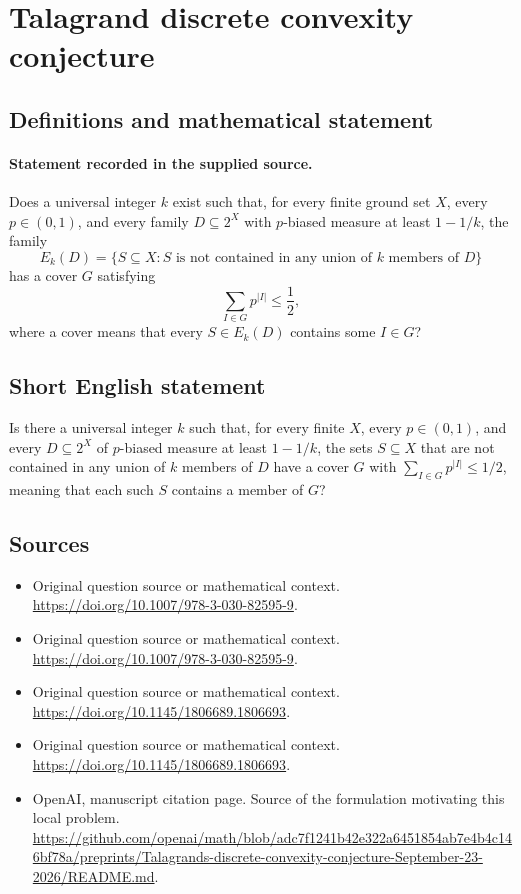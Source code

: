 \documentclass[11pt]{article}
\begin{document}
\section*{Talagrand discrete convexity conjecture}\label{30007105}
\subsection{Definitions and mathematical statement}
\paragraph{Statement recorded in the supplied source.}
Does a universal integer $k$ exist such that, for every finite ground set $X$, every $p\in(0,1)$, and every family $D\subseteq 2^X$ with $p$-biased measure at least $1-1/k$, the family
\[
E_k(D)=\{S\subseteq X:S\text{ is not contained in any union of }k\text{ members of }D\}
\]
has a cover $G$ satisfying
\[
\sum_{I\in G}p^{|I|}\leq\frac12,
\]
where a cover means that every $S\in E_k(D)$ contains some $I\in G$?
\subsection{Short English statement}
Is there a universal integer $k$ such that, for every finite $X$, every $p\in(0,1)$, and every $D\subseteq2^X$ of $p$-biased measure at least $1-1/k$, the sets $S\subseteq X$ that are not contained in any union of $k$ members of $D$ have a cover $G$ with $\sum_{I\in G}p^{|I|}\leq1/2$, meaning that each such $S$ contains a member of $G$?
\subsection{Sources}
\begin{itemize}
\item[S1] Original question source or mathematical context.
\url{https://doi.org/10.1007/978-3-030-82595-9}.
\item[S2] Original question source or mathematical context.
\url{https://doi.org/10.1007/978-3-030-82595-9}.
\item[S3] Original question source or mathematical context.
\url{https://doi.org/10.1145/1806689.1806693}.
\item[S4] Original question source or mathematical context.
\url{https://doi.org/10.1145/1806689.1806693}.
\item[S5] OpenAI, manuscript citation page. Source of the formulation motivating this local problem.
\url{https://github.com/openai/math/blob/adc7f1241b42e322a6451854ab7e4b4c146bf78a/preprints/Talagrands-discrete-convexity-conjecture-September-23-2026/README.md}.
\end{itemize}
\end{document}
